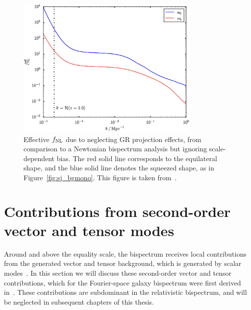 \begin{figure}[!ht]
	\centering
	\includegraphics[width=0.8\textwidth]{fig/sj_fnleff.png}
	\caption{Effective $f_\text{NL}$ due to neglecting GR projection effects, from comparison to a Newtonian bispectrum analysis but ignoring scale-dependent bias. The red solid line corresponds to the equilateral shape, and the blue solid line denotes the squeezed shape, as in Figure~\ref{fig:sj_bgmono}. This figure is taken from~\cite{Umeh:2016nuh}.}
	\label{fig:sj_fnleff}
\end{figure}

\section{Contributions from second-order vector and tensor modes}\label{sec:tensorvector}

Around and above the equality scale, the bispectrum receives local contributions from the generated vector and tensor background, which is generated by scalar modes~\cite{Tomita:2005et,Mollerach:2003nq,Ananda:2006af,Lu:2007cj,Baumann:2007zm,Hwang:2017oxa,Lu:2008ju}. In this section we will discuss these second-order vector and tensor contributions, which for the Fourier-space galaxy bispectrum were first derived in~\cite{Jolicoeur:2018blf}. These contributions are subdominant in the relativistic bispectrum, and will be neglected in subsequent chapters of this thesis. 

